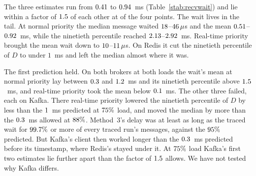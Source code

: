 \documentclass[10pt,journal,onecolumn]{IEEEtran}
\newcommand{\kafka}{Kafka}
\newcommand{\redis}{Redis}
\begin{document}
\begin{table}[tb]
\caption{\textbf{Three measurements put the receiving thread's wait at
$\recvWaitAddedLo$--$\recvWaitAddedHi$~ms of the mean latency.} One row for each broker and load.
Method~1 is the fall in mean $D$ when the consumer alone runs at real-time priority. Methods~2
and~3 are the falls, from normal to real-time priority, in the mean traced wait and in the mean
delay from the kernel's receive timestamp to the timestamp. Each figure is a setup's median over
its runs. The client's work is the median, over traced runs, of the delay beyond the traced
wait.}
\label{stab:recvwait}
\centering
\footnotesize

\end{table}

The three estimates run from $\recvWaitAddedLo$ to $\recvWaitAddedHi$~ms
(Table~\ref{stab:recvwait}) and lie within a factor of $1.5$ of each other at
\recvWaitAgreePartsWord{} of the four points. The wait lives in the tail. At normal priority the
median message waited $18$--$46\,\mu$s and the mean
$0.51$--$0.92$~ms, while the ninetieth percentile reached
$2.13$--$2.92$~ms.
Real-time priority brought the mean wait down to
$10$--$11\,\mu$s. On \redis{} it cut the ninetieth percentile
of $D$ to under $1$~ms and left the median almost where it was.

The first prediction held. On both brokers at both loads the wait's mean at normal priority lay
between $0.3$ and $1.2$~ms and its ninetieth percentile above
$1.5$~ms, and real-time priority took the mean below $0.1$~ms. The
other three failed, each on \kafka{}. There real-time priority lowered the ninetieth percentile of
$D$ by less than the $1$~ms predicted at $75\%$ load, and moved the
median by more than the $0.3$~ms allowed at $88\%$. Method~3's delay was
at least as long as the traced wait for $99.7\%$ or more of every traced run's
messages, against the $95\%$ predicted. But \kafka{}'s client then worked longer
than the $0.3$~ms predicted before its timestamp, where \redis{}'s stayed under it. At
$75\%$ load \kafka{}'s first two estimates lie further apart than the factor of
$1.5$ allows. We have not tested why \kafka{} differs.
\end{document}
